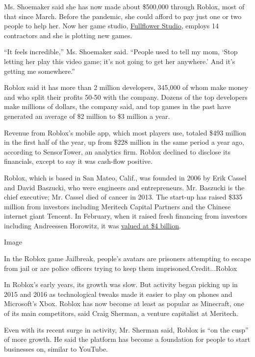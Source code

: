 Ms. Shoemaker said she has now made about \$500,000 through Roblox, most
of that since March. Before the pandemic, she could afford to pay just
one or two people to help her. Now her game studio,
\href{https://www.fullflowerstudio.com/}{Fullflower Studio}, employs 14
contractors and she is plotting new games.

``It feels incredible,'' Ms. Shoemaker said. ``People used to tell my
mom, `Stop letting her play this video game; it's not going to get her
anywhere.' And it's getting me somewhere.''

Roblox said it has more than 2 million developers, 345,000 of whom make
money and who split their profits 50-50 with the company. Dozens of the
top developers make millions of dollars, the company said, and top games
in the past have generated an average of \$2 million to \$3 million a
year.

Revenue from Roblox's mobile app, which most players use, totaled \$493
million in the first half of the year, up from \$228 million in the same
period a year ago, according to SensorTower, an analytics firm. Roblox
declined to disclose its financials, except to say it was cash-flow
positive.

Roblox, which is based in San Mateo, Calif., was founded in 2006 by Erik
Cassel and David Baszucki, who were engineers and entrepreneurs. Mr.
Baszucki is the chief executive; Mr. Cassel died of cancer in 2013. The
start-up has raised \$335 million from investors including Meritech
Capital Partners and the Chinese internet giant Tencent. In February,
when it raised fresh financing from investors including Andreessen
Horowitz, it was
\href{https://www.wsj.com/articles/roblox-raises-150-million-in-funding-in-bet-on-metaverse-11582754400}{valued
at \$4 billion}.

Image

In the Roblox game Jailbreak, people's avatars are prisoners attempting
to escape from jail or are police officers trying to keep them
imprisoned.Credit...Roblox

In Roblox's early years, its growth was slow. But activity began picking
up in 2015 and 2016 as technological tweaks made it easier to play on
phones and Microsoft's Xbox. Roblox has now become at least as popular
as Minecraft, one of its main competitors, said Craig Sherman, a venture
capitalist at Meritech.

Even with its recent surge in activity, Mr. Sherman said, Roblox is ``on
the cusp'' of more growth. He said the platform has become a foundation
for people to start businesses on, similar to YouTube.

